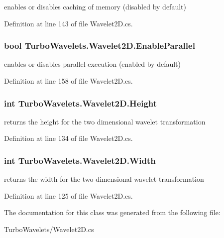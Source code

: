 enables or disables caching of memory (disabled by default) 



\-Definition at line 143 of file \-Wavelet2\-D.\-cs.

\hypertarget{class_turbo_wavelets_1_1_wavelet2_d_abec21e54c6ab8cce0e02ef3ad64ae5af}{
\subsubsection[{\-Enable\-Parallel}]{\setlength{\rightskip}{0pt plus 5cm}bool {\bf \-Turbo\-Wavelets.\-Wavelet2\-D.\-Enable\-Parallel}}}\label{class_turbo_wavelets_1_1_wavelet2_d_abec21e54c6ab8cce0e02ef3ad64ae5af}


enables or disables parallel execution (enabled by default) 



\-Definition at line 158 of file \-Wavelet2\-D.\-cs.

\hypertarget{class_turbo_wavelets_1_1_wavelet2_d_a277d0f89d73f839350c64a83ccd76ff6}{
\subsubsection[{\-Height}]{\setlength{\rightskip}{0pt plus 5cm}int {\bf \-Turbo\-Wavelets.\-Wavelet2\-D.\-Height}}}\label{class_turbo_wavelets_1_1_wavelet2_d_a277d0f89d73f839350c64a83ccd76ff6}


returns the height for the two dimensional wavelet transformation 



\-Definition at line 134 of file \-Wavelet2\-D.\-cs.

\hypertarget{class_turbo_wavelets_1_1_wavelet2_d_a30058c5e0e5bd95b29bc080efbcf9083}{
\subsubsection[{\-Width}]{\setlength{\rightskip}{0pt plus 5cm}int {\bf \-Turbo\-Wavelets.\-Wavelet2\-D.\-Width}}}\label{class_turbo_wavelets_1_1_wavelet2_d_a30058c5e0e5bd95b29bc080efbcf9083}


returns the width for the two dimensional wavelet transformation 



\-Definition at line 125 of file \-Wavelet2\-D.\-cs.



\-The documentation for this class was generated from the following file\-:\begin{DoxyCompactItemize}
\item 
\-Turbo\-Wavelets/\-Wavelet2\-D.\-cs\end{DoxyCompactItemize}
